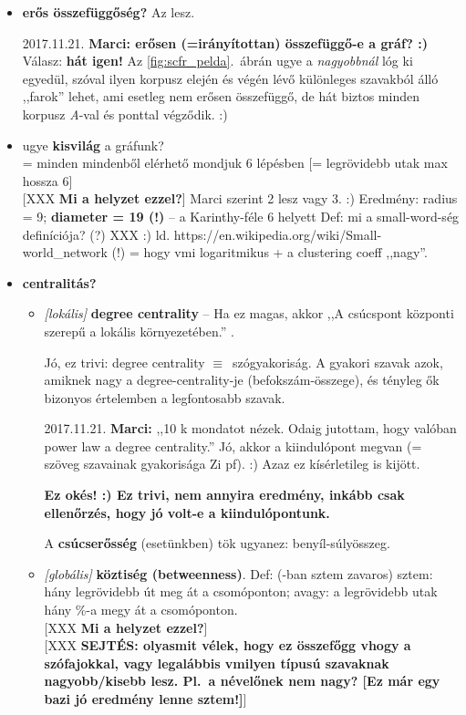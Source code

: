 \documentclass{llncs}
\newcommand{\embf}[1]{\textbf{#1}}
\newcommand{\XXX}[1]{{\small \color{megjcolor} [XXX #1]}}
\newcommand{\XXXb}[1]{\XXX{\embf{#1}}}
\newcommand{\azonos}{\ensuremath{\equiv}\ }
\begin{document}
\begin{itemize}
\setlength\itemsep{1em}

\item
\embf{erős összefüggőség?}
Az lesz.

2017.11.21. \embf{Marci: erősen (=irányítottan) összefüggő-e a gráf? :)}
Válasz: \embf{hát igen!}
Az \ref{fig:scfr_pelda}.\ ábrán ugye a \emph{nagyobbnál} lóg ki egyedül,
szóval ilyen korpusz elején és végén lévő
különleges szavakból álló ,,farok'' lehet,
ami esetleg nem erősen összefüggő,
de hát biztos minden korpusz \emph{A}-val és ponttal végződik. :)

\item
ugye \embf{kisvilág} a gráfunk?\\
= minden mindenből elérhető mondjuk 6 lépésben
[= legrövidebb utak max hossza 6]\\
\XXXb{Mi a helyzet ezzel?}
%
Marci szerint 2 lesz vagy 3. :)
%
Eredmény:
radius = 9; \embf{diameter = 19 (!)} -- a Karinthy-féle 6 helyett
%
Def: mi a small-word-ség definíciója? (?) XXX :)
ld. https://en.wikipedia.org/wiki/Small-world\_network (!)
= hogy vmi logaritmikus + a clustering coeff ,,nagy''.

\item
\embf{centralitás?}

\begin{itemize}

\item
\emph{[lokális]} \embf{degree centrality} --
Ha ez magas, akkor
,,A csúcspont központi szerepű a lokális környezetében.''
\cite{kovacs2012magyar}.

Jó, ez trivi:
degree centrality \azonos szógyakoriság.
A gyakori szavak azok, amiknek nagy
a degree-centrality-je (befokszám-összege),
és tényleg ők bizonyos értelemben a legfontosabb szavak.

2017.11.21. \embf{Marci:}
,,10 k mondatot nézek.
Odaig jutottam, hogy valóban power law a degree centrality.''
Jó, akkor a kiindulópont megvan (= szöveg szavainak gyakorisága Zi pf). :)
Azaz ez kísérletileg is kijött.

\embf{Ez okés! :) Ez trivi, nem annyira eredmény,
inkább csak ellenőrzés, hogy jó volt-e a kiindulópontunk.}

A \embf{csúcserősség} (esetünkben) tök ugyanez: benyíl-súlyösszeg.

\item
\emph{[globális]} \embf{köztiség (betweenness)}.
Def: (\cite{kovacs2012magyar}-ban sztem zavaros)
sztem: hány legrövidebb út meg át a csomóponton;
avagy: a legrövidebb utak hány \%-a megy át a csomóponton.\\
\XXXb{Mi a helyzet ezzel?}\\
\XXXb{SEJTÉS: olyasmit vélek, hogy ez összefőgg vhogy a szófajokkal,
vagy legalábbis vmilyen típusú szavaknak nagyobb/kisebb lesz.
Pl.\ a névelőnek nem nagy? [Ez már egy bazi jó eredmény lenne sztem!]}


\end{itemize}
\end{itemize}
\end{document}
